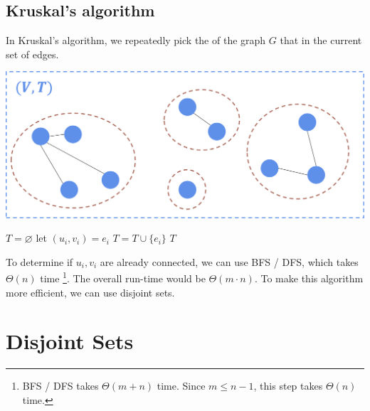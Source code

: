\subsection{Kruskal's algorithm}

In Kruskal's algorithm, we repeatedly pick the  of the graph $G$ that  in the current set of edges.

\begin{center} \includegraphics[width=0.5\linewidth]{images/Kruskals-Algorithm.png} \end{center}

\begin{algorithm}[H] \begin{algorithmic}[1]
        \State {}
        \State $T = \varnothing$
            \State let $(u_i, v_i) = e_i$
                \State $T = T \cup \{ e_i \}$
            \EndIf
        \EndFor
        \State \Return $T$
    \EndProcedure
\end{algorithmic} \end{algorithm}

To determine if $u_i, v_i$ are already connected, we can use BFS / DFS, which takes $\Theta(n)$ time \footnote{BFS / DFS takes $\Theta(m + n)$ time. Since $m \le n - 1$, this step takes $\Theta(n)$ time.}. The overall run-time would be $\Theta(m \cdot n)$. To make this algorithm more efficient, we can use disjoint sets.

\section{Disjoint Sets}

